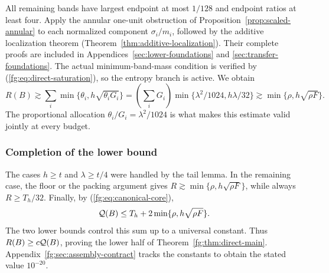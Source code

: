 All remaining bands have largest endpoint at most $1/128$ and
endpoint ratios at least four. Apply the annular one-unit obstruction
of Proposition~\ref{prop:scaled-annular} to each normalized component
$\sigma_i/m_i$, followed by the additive localization theorem
(Theorem~\ref{thm:additive-localization}). Their complete proofs are
included in Appendices~\ref{sec:lower-foundations} and
\ref{sec:transfer-foundations}.
The actual minimum-band-mass condition is verified by
(\ref{fg:eq:direct-saturation}), so the entropy branch is active.
We obtain
\[
 R(B)\gtrsim\sum_i\min\{\theta_i,h\sqrt{\theta_iG_i}\}
 =\left(\sum_iG_i\right)
       \min\{\lambda^2/1024,h\lambda/32\}
 \gtrsim\min\{\rho,h\sqrt{\rho F}\}.
\]
The proportional allocation $\theta_i/G_i=\lambda^2/1024$ is what
makes this estimate valid jointly at every budget.

\subsubsection{Completion of the lower bound}
The cases $h\ge t$ and $\lambda\ge t/4$ were handled by the tail lemma.
In the remaining case, the floor or the packing argument gives
$R\gtrsim\min\{\rho,h\sqrt{\rho F}\}$, while always $R\ge T_h/32$.
Finally, by (\ref{fg:eq:canonical-core}),
\[
 \mathcal Q(B)\le T_h+2\min\{\rho,h\sqrt{\rho F}\}.
\]
The two lower bounds control this sum up to a universal constant.
Thus $R(B)\ge c\mathcal Q(B)$, proving the lower half of
Theorem~\ref{fg:thm:direct-main}. Appendix~\ref{fg:sec:assembly-contract}
tracks the constants to obtain the stated value $10^{-20}$.
